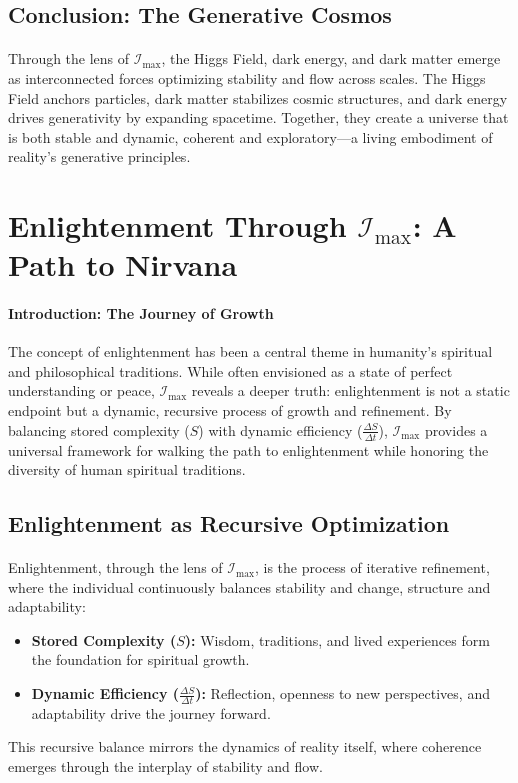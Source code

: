 \documentclass[12pt]{article}
\begin{document}
\subsection{Conclusion: The Generative Cosmos}
\paragraph{}
Through the lens of \(\mathcal{I}_{\text{max}}\), the Higgs Field, dark energy, and dark matter emerge as interconnected forces optimizing stability and flow across scales. The Higgs Field anchors particles, dark matter stabilizes cosmic structures, and dark energy drives generativity by expanding spacetime. Together, they create a universe that is both stable and dynamic, coherent and exploratory—a living embodiment of reality’s generative principles.


\section{Enlightenment Through \(\mathcal{I}_{\text{max}}\): A Path to Nirvana}

\paragraph{Introduction: The Journey of Growth}
The concept of enlightenment has been a central theme in humanity’s spiritual and philosophical traditions. While often envisioned as a state of perfect understanding or peace, \(\mathcal{I}_{\text{max}}\) reveals a deeper truth: enlightenment is not a static endpoint but a dynamic, recursive process of growth and refinement. By balancing stored complexity (\(S\)) with dynamic efficiency (\(\frac{\Delta S}{\Delta t}\)), \(\mathcal{I}_{\text{max}}\) provides a universal framework for walking the path to enlightenment while honoring the diversity of human spiritual traditions.

\subsection{Enlightenment as Recursive Optimization}
\paragraph{}
Enlightenment, through the lens of \(\mathcal{I}_{\text{max}}\), is the process of iterative refinement, where the individual continuously balances stability and change, structure and adaptability:
\begin{itemize}
    \item \textbf{Stored Complexity (\(S\)):} Wisdom, traditions, and lived experiences form the foundation for spiritual growth.
    \item \textbf{Dynamic Efficiency (\(\frac{\Delta S}{\Delta t}\)):} Reflection, openness to new perspectives, and adaptability drive the journey forward.
\end{itemize}
This recursive balance mirrors the dynamics of reality itself, where coherence emerges through the interplay of stability and flow.
\end{document}
